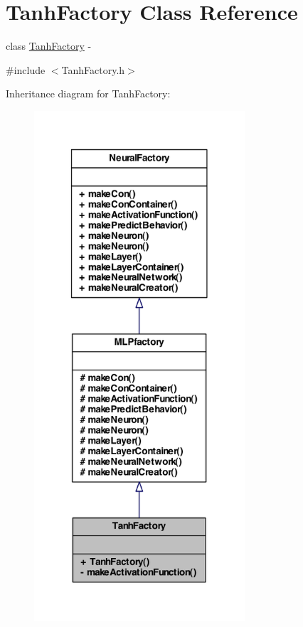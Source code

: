 \hypertarget{class_tanh_factory}{
\section{TanhFactory Class Reference}
\label{class_tanh_factory}
}


class \hyperlink{class_tanh_factory}{TanhFactory} -\/  




{\ttfamily \#include $<$TanhFactory.h$>$}



Inheritance diagram for TanhFactory:\nopagebreak
\begin{figure}[H]
\begin{center}
\leavevmode
\includegraphics[width=222pt]{class_tanh_factory__inherit__graph}
\end{center}
\end{figure}



